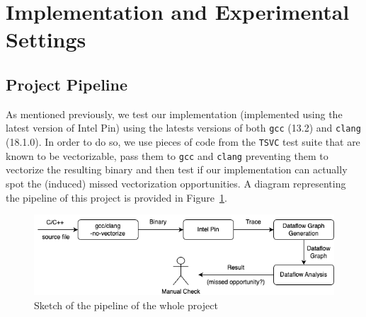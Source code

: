 \documentclass[acmsmall,review, nonacm]{acmart}
\begin{document}
\section{Implementation and Experimental Settings}

\subsection{Project Pipeline}
As mentioned previously, we test our implementation (implemented using the latest version of Intel Pin) using the latests versions of 
both \texttt{gcc} (13.2) and \texttt{clang} (18.1.0). In order to do so, we use pieces of code from the \texttt{TSVC} test suite
that are known to be vectorizable, pass them to \texttt{gcc} and \texttt{clang} preventing them to vectorize the resulting binary and then test
if our implementation can actually spot the (induced) missed vectorization opportunities. 
A diagram representing the pipeline of this project is provided in Figure~\ref{fig:pipeline}.

\begin{figure}[h!]
  \includegraphics*[width=0.9\linewidth]{img/pipeline.png}
  \caption{Sketch of the pipeline of the whole project}
  \label{fig:pipeline}
\end{figure}
\end{document}
